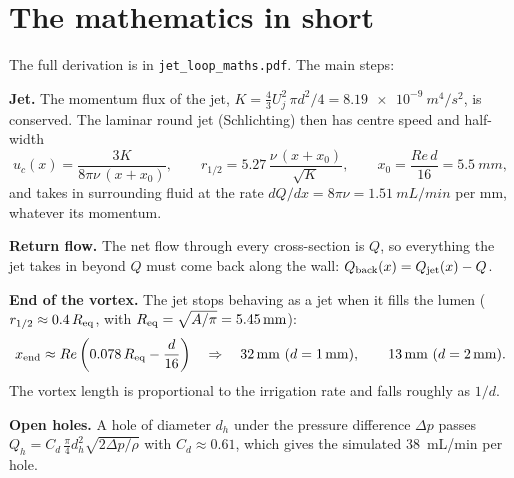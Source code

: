 \documentclass[10pt,a4paper]{article}
\begin{document}
\section{The mathematics in short}
The full derivation is in \texttt{jet\_loop\_maths.pdf}. The main steps:

\textbf{Jet.} The momentum flux of the jet, $K=\tfrac43U_j^2\,\pi d^2/4=\SI{8.19e-9}{m^4/s^2}$, is conserved.
The laminar round jet (Schlichting) then has centre speed and half-width
\begin{equation}
u_c(x)=\frac{3K}{8\pi\nu\,(x+x_0)},\qquad r_{1/2}=5.27\,\frac{\nu\,(x+x_0)}{\sqrt K},\qquad x_0=\frac{Re\,d}{16}=\SI{5.5}{mm},
\end{equation}
and takes in surrounding fluid at the rate $dQ/dx=8\pi\nu=\SI{1.51}{mL/min}$ per mm, whatever its momentum.

\textbf{Return flow.} The net flow through every cross-section is $Q$, so everything the jet takes in beyond
$Q$ must come back along the wall: $Q_{\rm back}(x)=Q_{\rm jet}(x)-Q$.

\textbf{End of the vortex.} The jet stops behaving as a jet when it fills the lumen
($r_{1/2}\approx 0.4\,R_{\rm eq}$, with $R_{\rm eq}=\sqrt{A/\pi}=\SI{5.45}{mm}$):
\begin{equation}
x_{\rm end}\approx Re\left(0.078\,R_{\rm eq}-\frac{d}{16}\right)
\quad\Rightarrow\quad \SI{32}{mm}\ (d=\SI{1}{mm}),\qquad \SI{13}{mm}\ (d=\SI{2}{mm}).\label{eq:xend}
\end{equation}
The vortex length is proportional to the irrigation rate and falls roughly as $1/d$.

\textbf{Open holes.} A hole of diameter $d_h$ under the pressure difference $\Delta p$ passes
$Q_h=C_d\,\tfrac{\pi}{4}d_h^2\sqrt{2\Delta p/\rho}$ with $C_d\approx0.61$, which gives the simulated
\SI{38}{mL/min} per hole.
\end{document}

